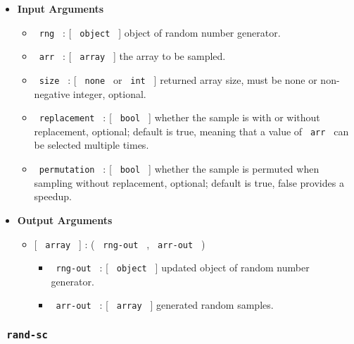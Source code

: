 \begin{Shaded}
\begin{Highlighting}[]
\end{Highlighting}
\end{Shaded}

\begin{itemize}
\item
  \textbf{Input Arguments}

  \begin{itemize}
  \tightlist
  \item
    \texttt{\ rng\ } : {[} \texttt{\ object\ } {]} object of random
    number generator.
  \item
    \texttt{\ arr\ } : {[} \texttt{\ array\ } {]} the array to be
    sampled.
  \item
    \texttt{\ size\ } : {[} \texttt{\ none\ } or \texttt{\ int\ } {]}
    returned array size, must be none or non-negative integer, optional.
  \item
    \texttt{\ replacement\ } : {[} \texttt{\ bool\ } {]} whether the
    sample is with or without replacement, optional; default is true,
    meaning that a value of \texttt{\ arr\ } can be selected multiple
    times.
  \item
    \texttt{\ permutation\ } : {[} \texttt{\ bool\ } {]} whether the
    sample is permuted when sampling without replacement, optional;
    default is true, false provides a speedup.
  \end{itemize}
\item
  \textbf{Output Arguments}

  \begin{itemize}
  \tightlist
  \item
    {[} \texttt{\ array\ } {]} : ( \texttt{\ rng-out\ } ,
    \texttt{\ arr-out\ } )

    \begin{itemize}
    \tightlist
    \item
      \texttt{\ rng-out\ } : {[} \texttt{\ object\ } {]} updated object
      of random number generator.
    \item
      \texttt{\ arr-out\ } : {[} \texttt{\ array\ } {]} generated random
      samples.
    \end{itemize}
  \end{itemize}
\end{itemize}

\subsubsection{\texorpdfstring{\texttt{\ rand-sc\ }}{ rand-sc }}\label{rand-sc}

